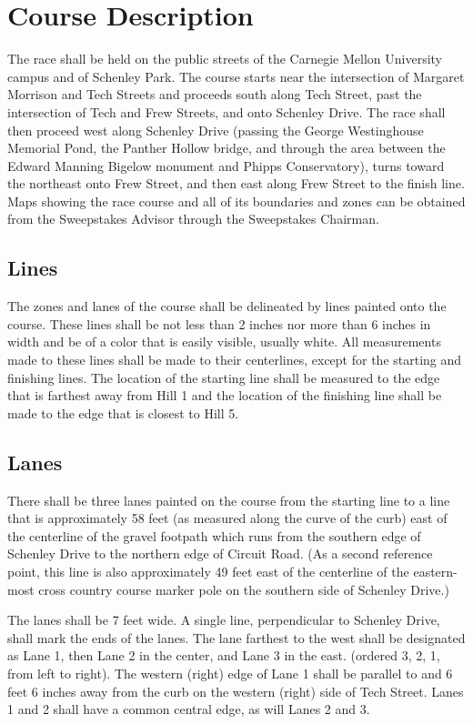 \chapter{Course Description}

	The race shall be held on the public streets of the Carnegie Mellon University
	campus and of Schenley Park. The course starts near the intersection of
	Margaret Morrison and Tech Streets and proceeds south along Tech Street, past
	the intersection of Tech and Frew Streets, and onto Schenley Drive. The race
	shall then proceed west along Schenley Drive (passing the George Westinghouse
	Memorial Pond, the Panther Hollow bridge, and through the area between the
	Edward Manning Bigelow monument and Phipps Conservatory), turns toward the
	northeast onto Frew Street, and then east along Frew Street to the finish line.
	Maps showing the race course and all of its boundaries and zones can be
	obtained from the Sweepstakes Advisor through the Sweepstakes Chairman.

\section{Lines}

	The zones and lanes of the course shall be delineated by lines painted onto the
	course. These lines shall be not less than 2 inches nor more than 6 inches in
	width and be of a color that is easily visible, usually white. All
	measurements made to these lines shall be made to their centerlines, except for
	the starting and finishing lines. The location of the starting line shall be
	measured to the edge that is farthest away from Hill 1 and the location of the
	finishing line shall be made to the edge that is closest to Hill 5.

\section{Lanes}

	There shall be three lanes painted on the course from the starting line to a
	line that is approximately 58 feet (as measured along the curve of the curb)
	east of the centerline of the gravel footpath which runs from the southern edge
	of Schenley Drive to the northern edge of Circuit Road. (As a second reference
	point, this line is also approximately 49 feet east of the centerline of the
	eastern-most cross country course marker pole on the southern side of Schenley
	Drive.)

	The lanes shall be 7 feet wide. A single line, perpendicular to Schenley Drive,
	shall mark the ends of the lanes. The lane farthest to the west shall be
	designated as Lane 1, then Lane 2 in the center, and Lane 3 in the east.
	(ordered 3, 2, 1, from left to right). The western (right)
	edge of Lane 1 shall be parallel to and 6 feet 6 inches away from the curb on
	the western (right) side of Tech Street. Lanes 1 and 2 shall have a common central
	edge, as will Lanes 2 and 3.

